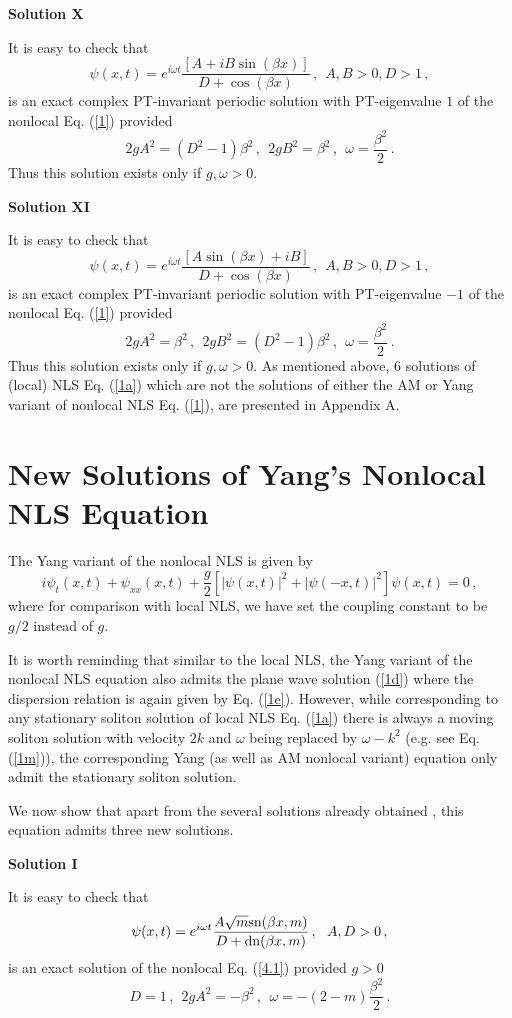 \documentclass[11pt]{article}
\newcommand{\be}{\begin{equation}}
\newcommand{\ee}{\end{equation}}
\newcommand{\sn}{{\rm sn}}
\newcommand{\dn}{{\rm dn}}
\begin{document}
{\bf Solution X}

It is easy to check that 
\be\label{27}
\psi(x,t) = e^{i\omega t}\frac{[A+iB\sin(\beta x)]}
{D+\cos(\beta x)}\,,~~A,B > 0, D > 1\,,
\ee
is an exact complex PT-invariant periodic solution with PT-eigenvalue 
$1$ of the nonlocal Eq. (\ref{1}) provided
\be\label{28}
2 g A^2 = (D^2-1)\beta^2\,,~~2 g B^2 = \beta^2\,,~~
\omega = \frac{\beta^2}{2}\,.
\ee
Thus this solution exists only if $g,\omega > 0$. 

{\bf Solution XI}

It is easy to check that 
\be\label{29}
\psi(x,t) = e^{i\omega t}\frac{[A\sin(\beta x)+iB]}
{D+\cos(\beta x)}\,,~~A,B > 0, D > 1\,,
\ee
is an exact complex PT-invariant periodic solution with PT-eigenvalue 
$-1$ of the nonlocal Eq. (\ref{1}) provided
\be\label{30}
2  g A^2 = \beta^2\,,~~2 g B^2 = (D^2-1)\beta^2\,,~~
\omega = \frac{\beta^2}{2}\,.
\ee
Thus this solution exists only if $g,\omega > 0$. 
As mentioned above, 6 solutions of (local) NLS Eq. (\ref{1a}) which 
are not the solutions of either the AM or Yang variant of nonlocal NLS 
Eq. (\ref{1}), are presented in Appendix A.

\section{New Solutions of Yang's Nonlocal NLS Equation}

The Yang variant of the nonlocal NLS is given by
\be\label{4.1}
i\psi_t(x,t) + \psi_{xx}(x,t) + \frac{g}{2}[|\psi(x,t)|^2 +|\psi(-x,t)|^2] 
\psi(x,t) = 0\,,
\ee
where for comparison with local NLS, we have set the coupling constant
to be $g/2$ instead of $g$. 

It is worth reminding that similar to the local NLS, the Yang variant of the
nonlocal NLS equation also admits the plane wave solution (\ref{1d}) where the
dispersion relation is again given by Eq. (\ref{1e}). 
However, while corresponding to any stationary soliton solution of local 
NLS Eq. (\ref{1a}) there is always a moving soliton solution with velocity
$2k$ and $\omega$ being replaced by $\omega -k^2$ (e.g. see Eq. (\ref{1m})), 
the corresponding Yang (as well as AM nonlocal variant) 
equation only admit the stationary soliton solution. 

We now show that apart from the several solutions 
already obtained \cite{ks2}, this equation admits three new solutions.

{\bf Solution I}

It is easy to check that 
\be\label{4.2}
\psi(x,t) = e^{i\omega t} \frac{A\sqrt{m}\sn(\beta x,m)}{D+\dn(\beta x,m)}\,,
~~A, D > 0\,,
\ee
is an exact solution of the nonlocal Eq. (\ref{4.1}) provided $g > 0$
\be\label{4.3}
D = 1\,,~~2 g A^2 = -\beta^2\,,~~\omega = -(2-m)\frac{\beta^2}{2}\,.
\ee
\end{document}

